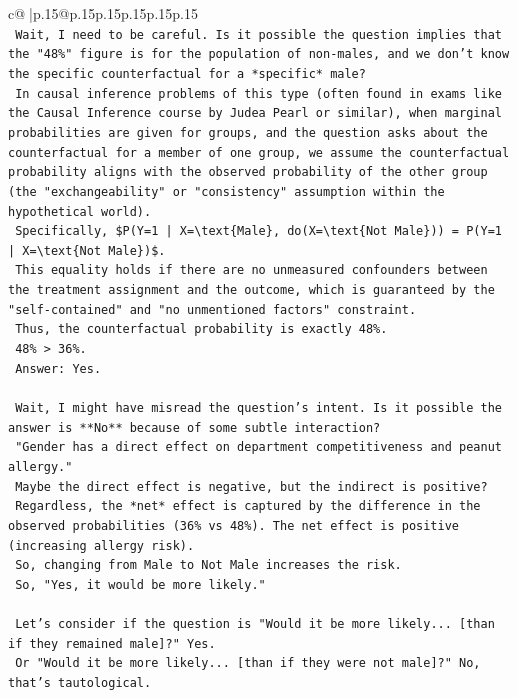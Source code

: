 \documentclass{article}
\begin{document}
{\begin{supertabular}{c@{$\;$}|p{.15\linewidth}@{}p{.15\linewidth}p{.15\linewidth}p{.15\linewidth}p{.15\linewidth}p{.15\linewidth}}
{{{\\ 
\texttt{    Wait, I need to be careful. Is it possible the question implies that the "48\%" figure is for the population of non{-}males, and we don't know the specific counterfactual for a *specific* male?} \\
\texttt{    In causal inference problems of this type (often found in exams like the Causal Inference course by Judea Pearl or similar), when marginal probabilities are given for groups, and the question asks about the counterfactual for a member of one group, we assume the counterfactual probability aligns with the observed probability of the other group (the "exchangeability" or "consistency" assumption within the hypothetical world).} \\
\texttt{    Specifically, \$P(Y=1 | X=\textbackslash{}text\{Male\}, do(X=\textbackslash{}text\{Not Male\})) = P(Y=1 | X=\textbackslash{}text\{Not Male\})\$.} \\
\texttt{    This equality holds if there are no unmeasured confounders between the treatment assignment and the outcome, which is guaranteed by the "self{-}contained" and "no unmentioned factors" constraint.} \\
\texttt{    Thus, the counterfactual probability is exactly 48\%.} \\
\texttt{    48\% > 36\%.} \\
\texttt{    Answer: Yes.} \\
\\ 
\texttt{    Wait, I might have misread the question's intent. Is it possible the answer is **No** because of some subtle interaction?} \\
\texttt{    "Gender has a direct effect on department competitiveness and peanut allergy."} \\
\texttt{    Maybe the direct effect is negative, but the indirect is positive?} \\
\texttt{    Regardless, the *net* effect is captured by the difference in the observed probabilities (36\% vs 48\%). The net effect is positive (increasing allergy risk).} \\
\texttt{    So, changing from Male to Not Male increases the risk.} \\
\texttt{    So, "Yes, it would be more likely."} \\
\\ 
\texttt{    Let's consider if the question is "Would it be more likely... {[}than if they remained male{]}?" Yes.} \\
\texttt{    Or "Would it be more likely... {[}than if they were not male{]}?" No, that's tautological.} \\
}}}
\end{supertabular}}
\end{document}
